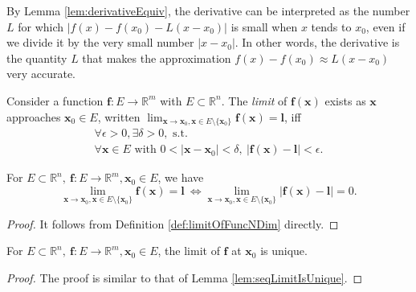 \begin{rem}
  By Lemma \ref{lem:derivativeEquiv},
  the derivative can be interpreted as the number $L$
  for which $|f(x)- f(x_0)-L(x-x_0)|$ is small when $x$ tends to $x_0$,
  even if we divide it by the very small number $|x-x_0|$.
  In other words, the derivative is the quantity $L$
  that makes the approximation $f(x)-f(x_0) \approx L(x-x_0)$
  very accurate.
\end{rem}

\begin{defn}
  \label{def:limitOfFuncNDim}
  Consider a function $\mathbf{f}: E\rightarrow \mathbb{R}^m$ with
  $E\subset \mathbb{R}^n$.
  The \emph{limit} of $\mathbf{f}(\mathbf{x})$ exists as
  $\mathbf{x}$ approaches $\mathbf{x}_{0}\in E$, written
  $\lim_{\mathbf{x}\rightarrow \mathbf{x}_{0},\mathbf{x}\in E\setminus\{\mathbf{x}_{0}\}}
  \mathbf{f}(\mathbf{x})=\mathbf{l}$, iff
  \begin{equation}
    \label{eq:limitOfFuncNDim}
    \begin{array}{l}
      \forall \epsilon>0,\exists \delta>0,\text{ s.t. }\\
      \forall \mathbf{x}\in E
      \text{ with }0<|\mathbf{x}-\mathbf{x}_{0}|<\delta,\
      |\mathbf{f}(\mathbf{x})-\mathbf{l}|<\epsilon.
    \end{array}
  \end{equation}
\end{defn}

\begin{lem}
  \label{lem:NDimLimitEquivToZeroVector}
  For $E\subset \mathbb{R}^{n},\ \mathbf{f}: E\rightarrow \mathbb{R}^{m},
  \mathbf{x}_{0}\in E$, we have
  \begin{displaymath}
    \lim_{\mathbf{x}\rightarrow \mathbf{x}_{0},\mathbf{x}\in E\setminus\{\mathbf{x}_{0}\}}
    \mathbf{f}(\mathbf{x})=\mathbf{l}
    \ \Leftrightarrow
    \lim_{\mathbf{x}\rightarrow \mathbf{x}_{0},\mathbf{x}\in E\setminus\{\mathbf{x}_{0}\}}
    |\mathbf{f}(\mathbf{x})-\mathbf{l}|=0.
  \end{displaymath}
\end{lem}
\begin{proof}
  It follows from Definition \ref{def:limitOfFuncNDim} directly.
\end{proof}

\begin{lem}
  \label{lem:funcNdimLimitIsUnique}
  For $E\subset \mathbb{R}^{n},\ \mathbf{f}: E\rightarrow \mathbb{R}^{m},
  \mathbf{x}_{0}\in E$, the limit of $\mathbf{f}$ at $\mathbf{x}_{0}$
  is unique.
\end{lem}
\begin{proof}
  The proof is similar to that of Lemma \ref{lem:seqLimitIsUnique}.
\end{proof}

